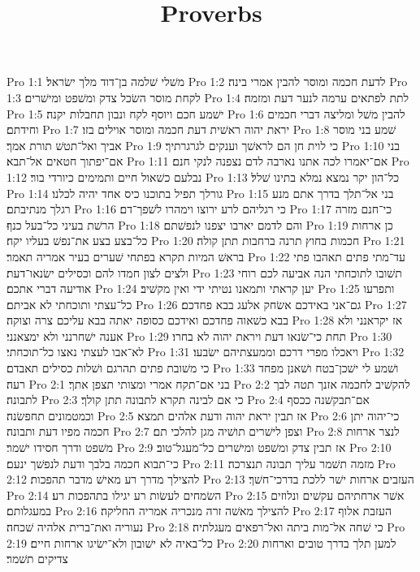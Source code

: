 

\title{Proverbs}

Pro 1:1  משׁלי שׁלמה בן־דוד מלך ישׂראל׃
Pro 1:2  לדעת חכמה ומוסר להבין אמרי בינה׃
Pro 1:3  לקחת מוסר השׂכל צדק ומשׁפט ומישׁרים׃
Pro 1:4  לתת לפתאים ערמה לנער דעת ומזמה׃
Pro 1:5  ישׁמע חכם ויוסף לקח ונבון תחבלות יקנה׃
Pro 1:6  להבין משׁל ומליצה דברי חכמים וחידתם׃
Pro 1:7  יראת יהוה ראשׁית דעת חכמה ומוסר אוילים בזו׃
Pro 1:8  שׁמע בני מוסר אביך ואל־תטשׁ תורת אמך׃
Pro 1:9  כי לוית חן הם לראשׁך וענקים לגרגרתיך׃
Pro 1:10  בני אם־יפתוך חטאים אל־תבא׃
Pro 1:11  אם־יאמרו לכה אתנו נארבה לדם נצפנה לנקי חנם׃
Pro 1:12  נבלעם כשׁאול חיים ותמימים כיורדי בור׃
Pro 1:13  כל־הון יקר נמצא נמלא בתינו שׁלל׃
Pro 1:14  גורלך תפיל בתוכנו כיס אחד יהיה לכלנו׃
Pro 1:15  בני אל־תלך בדרך אתם מנע רגלך מנתיבתם׃
Pro 1:16  כי רגליהם לרע ירוצו וימהרו לשׁפך־דם׃
Pro 1:17  כי־חנם מזרה הרשׁת בעיני כל־בעל כנף׃
Pro 1:18  והם לדמם יארבו יצפנו לנפשׁתם׃
Pro 1:19  כן ארחות כל־בצע בצע את־נפשׁ בעליו יקח׃
Pro 1:20  חכמות בחוץ תרנה ברחבות תתן קולה׃
Pro 1:21  בראשׁ המיות תקרא בפתחי שׁערים בעיר אמריה תאמר׃
Pro 1:22  עד־מתי פתים תאהבו פתי ולצים לצון חמדו להם וכסילים ישׂנאו־דעת׃
Pro 1:23  תשׁובו לתוכחתי הנה אביעה לכם רוחי אודיעה דברי אתכם׃
Pro 1:24  יען קראתי ותמאנו נטיתי ידי ואין מקשׁיב׃
Pro 1:25  ותפרעו כל־עצתי ותוכחתי לא אביתם׃
Pro 1:26  גם־אני באידכם אשׂחק אלעג בבא פחדכם׃
Pro 1:27  בבא כשׁאוה פחדכם ואידכם כסופה יאתה בבא עליכם צרה וצוקה׃
Pro 1:28  אז יקראנני ולא אענה ישׁחרנני ולא ימצאנני׃
Pro 1:29  תחת כי־שׂנאו דעת ויראת יהוה לא בחרו׃
Pro 1:30  לא־אבו לעצתי נאצו כל־תוכחתי׃
Pro 1:31  ויאכלו מפרי דרכם וממעצתיהם ישׂבעו׃
Pro 1:32  כי משׁובת פתים תהרגם ושׁלות כסילים תאבדם׃
Pro 1:33  ושׁמע לי ישׁכן־בטח ושׁאנן מפחד רעה׃
Pro 2:1  בני אם־תקח אמרי ומצותי תצפן אתך׃
Pro 2:2  להקשׁיב לחכמה אזנך תטה לבך לתבונה׃
Pro 2:3  כי אם לבינה תקרא לתבונה תתן קולך׃
Pro 2:4  אם־תבקשׁנה ככסף וכמטמונים תחפשׂנה׃
Pro 2:5  אז תבין יראת יהוה ודעת אלהים תמצא׃
Pro 2:6  כי־יהוה יתן חכמה מפיו דעת ותבונה׃
Pro 2:7  וצפן לישׁרים תושׁיה מגן להלכי תם׃
Pro 2:8  לנצר ארחות משׁפט ודרך חסידו ישׁמר׃
Pro 2:9  אז תבין צדק ומשׁפט ומישׁרים כל־מעגל־טוב׃
Pro 2:10  כי־תבוא חכמה בלבך ודעת לנפשׁך ינעם׃
Pro 2:11  מזמה תשׁמר עליך תבונה תנצרכה׃
Pro 2:12  להצילך מדרך רע מאישׁ מדבר תהפכות׃
Pro 2:13  העזבים ארחות ישׁר ללכת בדרכי־חשׁך׃
Pro 2:14  השׂמחים לעשׂות רע יגילו בתהפכות רע׃
Pro 2:15  אשׁר ארחתיהם עקשׁים ונלוזים במעגלותם׃
Pro 2:16  להצילך מאשׁה זרה מנכריה אמריה החליקה׃
Pro 2:17  העזבת אלוף נעוריה ואת־ברית אלהיה שׁכחה׃
Pro 2:18  כי שׁחה אל־מות ביתה ואל־רפאים מעגלתיה׃
Pro 2:19  כל־באיה לא ישׁובון ולא־ישׂיגו ארחות חיים׃
Pro 2:20  למען תלך בדרך טובים וארחות צדיקים תשׁמר׃
